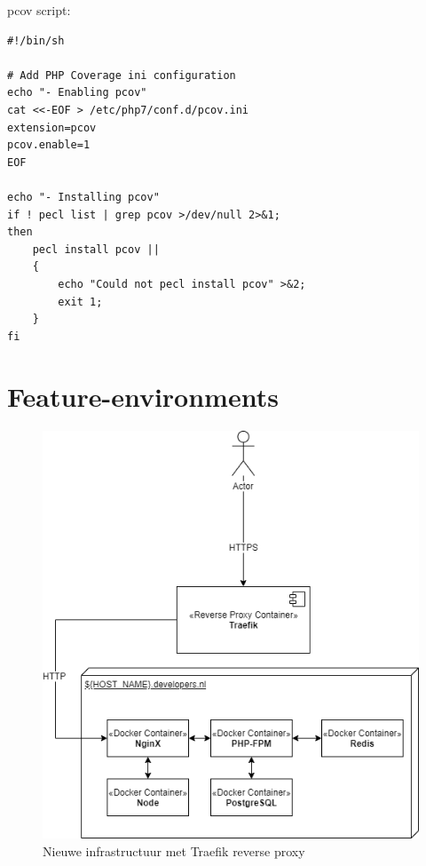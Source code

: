 pcov script:
\begin{verbatim}
#!/bin/sh

# Add PHP Coverage ini configuration
echo "- Enabling pcov"
cat <<-EOF > /etc/php7/conf.d/pcov.ini
extension=pcov
pcov.enable=1
EOF

echo "- Installing pcov"
if ! pecl list | grep pcov >/dev/null 2>&1;
then
    pecl install pcov ||
    {
        echo "Could not pecl install pcov" >&2;
        exit 1;
    }
fi
\end{verbatim}

\section{Feature-environments} \label{CodeFeatureEnvironments}
\begin{figure}[H]
	\centering
	\includegraphics[width=13cm]{Figures/Traefik}
	\decoRule
	\caption[Traefik Infrastructure]{Nieuwe infrastructuur met Traefik reverse proxy}
	\label{fig:traefikinfrastructure}
\end{figure}
